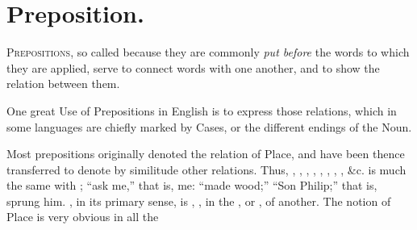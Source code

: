 \chapter{Preposition.}

\textsc{Prepositions}, so called because they are commonly \emph{put
  before} the words to which they are applied, serve to connect words
with one another, and to show the relation between them.

One great Use of Prepositions in English is to express those relations,
which in some languages are chiefly marked by Cases, or the different
endings of the Noun.

Most prepositions originally denoted the relation of Place, and have
been thence transferred to denote by similitude other relations. Thus,
, , , , , ,
, , \&c.  is much the same with ; ``ask
 me,'' that is,  me: ``made  wood;'' ``Son
 Philip;'' that is, sprung  him. , in its
primary sense, is , , in the , or
, of another. The notion of Place is very obvious in all the
